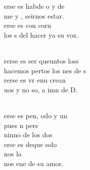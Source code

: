\documentclass[12pt]{article}
\begin{document}
\begin{multicols*}{2}
\begin{cancion}[Quererse][Ixcís]%
	erse es habde o y de \\
	me y , seirnos estar.\\
	erse es  con corn\\
	los s del  hacer ya su voz.\\\jump\\
	\begin{chorus}%
	rerse es ser queuntos loss\\
	hacemos pertos los nes de s\\
	rerse es vr enu crean \\
	uos y no so, a imn de D.\\
	\end{chorus}%
	\jump\\
	erse es pen, odo y un\\
	pues n pers \\
	ninno de los dos\\
	erse es deque  solo \\
	nos  la  \\
	nos ene de su amor.\\
\end{cancion}%


\end{multicols*}
\end{document}
